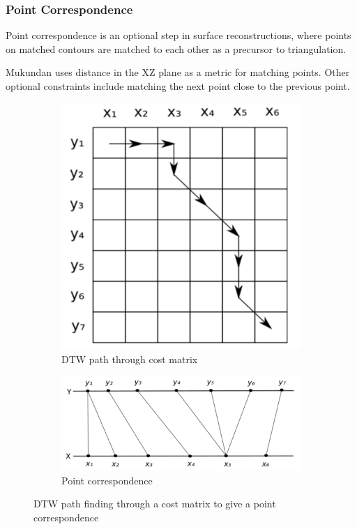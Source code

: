 \documentclass[11p, titlepage]{article}
\begin{document}
\subsubsection{Point Correspondence}
Point correspondence is an optional step in surface reconstructions, where points on matched contours are matched to each other as a precursor to triangulation.

Mukundan \cite{mukundan2016reconstruction} uses distance in the XZ plane as a metric for matching points. Other optional constraints include matching the next point close to the previous point.

\begin{figure}[h]
     \centering
     \begin{subfigure}[b]{0.2\textwidth}
         \centering
         \includegraphics[width=\textwidth]{diagrams/dtw1}
         \caption{DTW path through cost matrix}
         \label{fig:dtw1}
     \end{subfigure}
     \hfill
     \begin{subfigure}[b]{0.6\textwidth}
         \centering
         \includegraphics[width=\textwidth]{diagrams/dtw2}
         \caption{Point correspondence}
         \label{fig:dtw2}
     \end{subfigure}
        \caption{DTW path finding through a cost matrix to give a point correspondence \cite{mackay2019robust}}
        \label{fig:dtw}
\end{figure}
\end{document}
